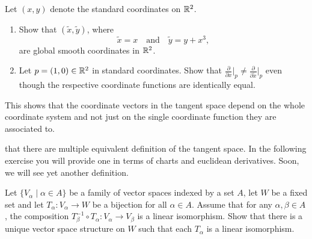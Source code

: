\begin{exercise}
  Let $(x,y)$ denote the standard coordinates on $\mathbb{R}^2$.
  \begin{enumerate}
    \item Show that $(\widetilde{x}, \widetilde{y})$, where 
    \begin{equation}
      \widetilde{x} = x
      \quad\mbox{and}\quad
      \widetilde{y} = y + x^3,
    \end{equation}
    are global smooth coordinates in $\mathbb{R}^2$.
    \item Let $p=(1,0)\in\mathbb{R}^2$ in standard coordinates.
    Show that $\frac{\partial}{\partial x}\Big|_p \neq \frac{\partial}{\partial \widetilde x}\Big|_p$ even though the respective coordinate functions are identically equal.
  \end{enumerate}
  This shows that the coordinate vectors in the tangent space depend on the whole coordinate system and not just on the single coordinate function they are associated to.
\end{exercise}

 that there are multiple equivalent definition of the tangent space. In the following exercise you will provide one in terms of charts and euclidean derivatives.
Soon, we will see yet another definition.

\begin{exercise}\label{exe:vsstruct}
  Let $\{V_\alpha \mid \alpha\in A\}$ be a family of vector spaces indexed by a set $A$, let $W$ be a fixed set and let $T_\alpha: V_\alpha\to W$ be a bijection for all $\alpha\in A$.
  Assume that for any $\alpha, \beta \in A$, the composition $T_\beta^{-1}\circ T_\alpha : V_\alpha \to V_\beta$ is a linear isomorphism.
  Show that there is a unique vector space structure on $W$ such that each $T_\alpha$ is a linear isomorphism.
\end{exercise}

